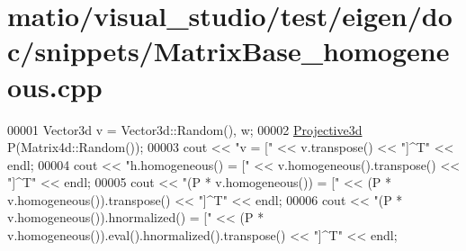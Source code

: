 \hypertarget{matio_2visual__studio_2test_2eigen_2doc_2snippets_2_matrix_base__homogeneous_8cpp_source}{}\section{matio/visual\+\_\+studio/test/eigen/doc/snippets/\+Matrix\+Base\+\_\+homogeneous.cpp}
\label{matio_2visual__studio_2test_2eigen_2doc_2snippets_2_matrix_base__homogeneous_8cpp_source}

\begin{DoxyCode}
00001 Vector3d v = Vector3d::Random(), w;
00002 \hyperlink{group___geometry___module_gab9cec8c457da930391eb73370e07aaae}{Projective3d} P(Matrix4d::Random());
00003 cout << \textcolor{stringliteral}{"v                                   = ["} << v.transpose() << \textcolor{stringliteral}{"]^T"} << endl;
00004 cout << \textcolor{stringliteral}{"h.homogeneous()                     = ["} << v.homogeneous().transpose() << \textcolor{stringliteral}{"]^T"} << endl;
00005 cout << \textcolor{stringliteral}{"(P * v.homogeneous())               = ["} << (P * v.homogeneous()).transpose() << \textcolor{stringliteral}{"]^T"} << endl;
00006 cout << \textcolor{stringliteral}{"(P * v.homogeneous()).hnormalized() = ["} << (P * v.homogeneous()).eval().hnormalized().transpose()
       << \textcolor{stringliteral}{"]^T"} << endl;
\end{DoxyCode}
